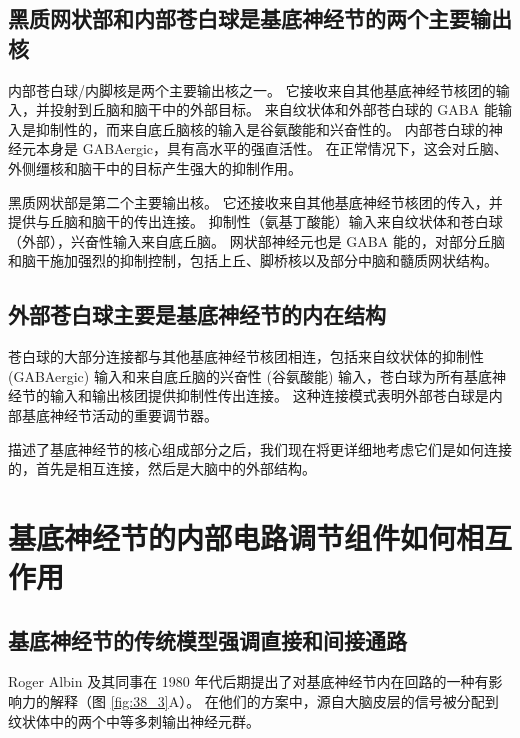 \subsection{黑质网状部和内部苍白球是基底神经节的两个主要输出核}
内部苍白球/内脚核是两个主要输出核之一。 它接收来自其他基底神经节核团的输入，并投射到丘脑和脑干中的外部目标。 来自纹状体和外部苍白球的 GABA 能输入是抑制性的，而来自底丘脑核的输入是谷氨酸能和兴奋性的。 内部苍白球的神经元本身是 GABAergic，具有高水平的强直活性。 在正常情况下，这会对丘脑、外侧缰核和脑干中的目标产生强大的抑制作用。

黑质网状部是第二个主要输出核。 它还接收来自其他基底神经节核团的传入，并提供与丘脑和脑干的传出连接。 抑制性（氨基丁酸能）输入来自纹状体和苍白球（外部），兴奋性输入来自底丘脑。 网状部神经元也是 GABA 能的，对部分丘脑和脑干施加强烈的抑制控制，包括上丘、脚桥核以及部分中脑和髓质网状结构。


\subsection{外部苍白球主要是基底神经节的内在结构}
苍白球的大部分连接都与其他基底神经节核团相连，包括来自纹状体的抑制性 (GABAergic) 输入和来自底丘脑的兴奋性 (谷氨酸能) 输入，苍白球为所有基底神经节的输入和输出核团提供抑制性传出连接。 这种连接模式表明外部苍白球是内部基底神经节活动的重要调节器。

描述了基底神经节的核心组成部分之后，我们现在将更详细地考虑它们是如何连接的，首先是相互连接，然后是大脑中的外部结构。


\section{基底神经节的内部电路调节组件如何相互作用}
\subsection{基底神经节的传统模型强调直接和间接通路}

Roger Albin 及其同事在 1980 年代后期提出了对基底神经节内在回路的一种有影响力的解释（图 \ref{fig:38_3}A）。 
在他们的方案中，源自大脑皮层的信号被分配到纹状体中的两个中等多刺输出神经元群。

